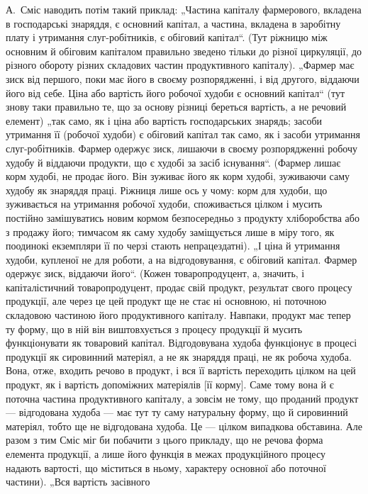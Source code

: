 А.~Сміс наводить потім такий приклад: „Частина капіталу фармерового,
вкладена в господарські знаряддя, є основний капітал, а частина,
вкладена в заробітну плату і утримання слуг-робітників, є обіговий капітал“.
(Тут ріжницю між основним й обіговим капіталом правильно зведено
тільки до різної циркуляції, до різного обороту різних складових
частин продуктивного капіталу). „Фармер має зиск від першого, поки має
його в своєму розпорядженні, і від другого, віддаючи його від себе.
Ціна або вартість його робочої худоби є основний капітал“ (тут знову таки
правильно те, що за основу різниці береться вартість, а не речовий
елемент) „так само, як і ціна або вартість господарських знарядь; засоби
утримання її (робочої худоби) є обіговий капітал так само, як і засоби
утримання слуг-робітників. Фармер одержує зиск, лишаючи в своєму
розпорядженні робочу худобу й віддаючи продукти, що є худобі за засіб
існування“. (Фармер лишає корм худобі, не продає його. Він зуживає
його як корм худобі, зуживаючи саму худобу як знаряддя праці.
Ріжниця лише ось у чому: корм для худоби, що зуживається на утримання
робочої худоби, споживається цілком і мусить постійно замішуватись
новим кормом безпосередньо з продукту хліборобства або з продажу
його; тимчасом як саму худобу заміщується лише в міру того, як
поодинокі екземпляри її по черзі стають непрацездатні). „І ціна й утримання
худоби, купленої не для роботи, а на відгодовування, є обіговий капітал.
Фармер одержує зиск, віддаючи його“. (Кожен товаропродуцент,
а, значить, і капіталістичний товаропродуцент, продає свій продукт,
результат свого процесу продукції, але через це цей продукт
ще не стає ні основною, ні поточною складовою частиною його
продуктивного капіталу. Навпаки, продукт має тепер ту форму, що
в ній він виштовхується з процесу продукції й мусить функціонувати як товаровий
капітал. Відгодовувана худоба функціонує в процесі продукції як
сировинний матеріял, а не як знаряддя праці, не як робоча худоба. Вона,
отже, входить речово в продукт, і вся її вартість переходить цілком
на цей продукт, як і вартість допоміжних матеріялів [її корму]. Саме тому
вона й є поточна частина продуктивного капіталу, а зовсім не тому,
що проданий продукт — відгодована худоба — має тут ту саму натуральну
форму, що й сировинний матеріял, тобто ще не відгодована худоба. Це —
цілком випадкова обставина. Але разом з тим Сміс міг би побачити з
цього прикладу, що не речова форма елемента продукції, а лише його
функція в межах продукційного процесу надають вартості, що міститься
в ньому, характеру основної або поточної частини). „Вся вартість засівного
